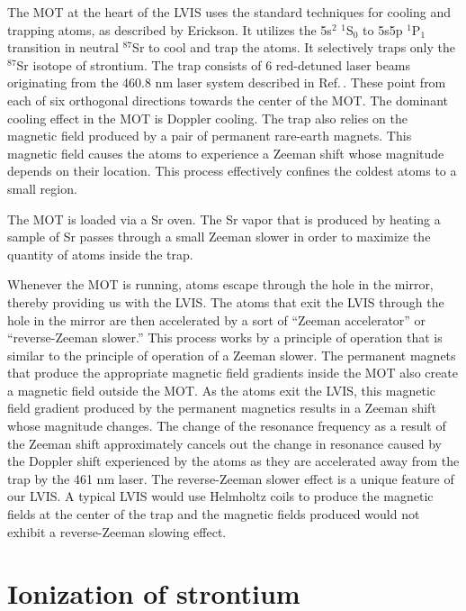The MOT at the heart of the LVIS uses the standard techniques for cooling and trapping atoms, as described by Erickson\cite{cjeDiss}. It utilizes the 5s$^2$ $^1$S$_0$ to 5s5p $^1$P$_1$ transition in neutral $^{87}$Sr to cool and trap the atoms. It selectively traps only the $^{87}$Sr isotope of strontium. The trap consists of 6 red-detuned laser beams originating from the 460.8 nm laser system described in Ref.\,\cite{cjeDiss}. These point from each of six orthogonal directions towards the center of the MOT. The dominant cooling effect in the MOT is Doppler cooling. 
The trap also relies on the magnetic field produced by a pair of permanent rare-earth magnets. This magnetic field causes the atoms to experience a Zeeman shift whose magnitude depends on their location. This process effectively confines the coldest atoms to a small region. 

The MOT is loaded via a Sr oven. The Sr vapor that is produced by heating a sample of Sr passes through a small Zeeman slower in order to maximize the quantity of atoms inside the trap. 



Whenever the MOT is running, atoms escape through the hole in the mirror, thereby providing us with the LVIS. The atoms that exit the LVIS through the hole in the mirror are then accelerated by a sort of ``Zeeman accelerator'' or ``reverse-Zeeman slower.'' This process works by a principle of operation that is similar to the principle of operation of a Zeeman slower. The permanent magnets that produce the appropriate magnetic field gradients inside the MOT also create a magnetic field outside the MOT. As the atoms exit the LVIS, this magnetic field gradient produced by the permanent magnetics results in a Zeeman shift whose magnitude changes. The change of the resonance frequency as a result of the Zeeman shift approximately cancels out the change in resonance caused by the Doppler shift experienced by the atoms as they are accelerated away from the trap by the 461 nm laser. The reverse-Zeeman slower effect is a unique feature of our LVIS. A typical LVIS would use Helmholtz coils to produce the magnetic fields at the center of the trap and the magnetic fields produced would not exhibit a reverse-Zeeman slowing effect.

\section{Ionization of strontium}
 
